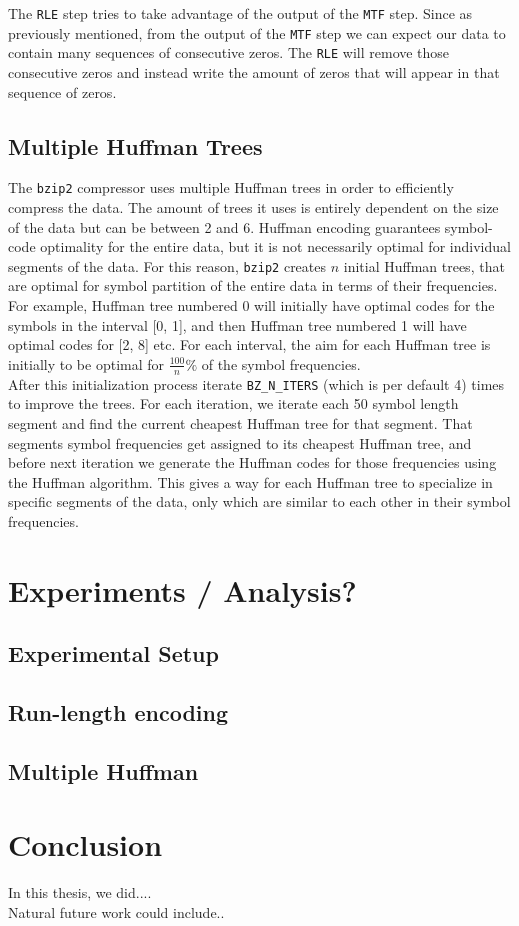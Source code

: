 \documentclass{article}
\begin{document}
The \texttt{RLE} step tries to take advantage of the output of the \texttt{MTF} step. Since as previously mentioned, from the output of the \texttt{MTF} step we can expect our data to contain many sequences of consecutive zeros. The \texttt{RLE} will remove those consecutive zeros and instead write the amount of zeros that will appear in that sequence of zeros.


\subsection{Multiple Huffman Trees}
The \texttt{bzip2} compressor uses multiple Huffman trees in order to efficiently compress the data. The amount of trees it uses is entirely dependent on the size of the data but can be between 2 and 6.
Huffman encoding guarantees symbol-code optimality for the entire data, but it is not necessarily optimal for individual segments of the data. For this reason, \texttt{bzip2} creates \(n\) initial Huffman trees, that are optimal for symbol partition of the entire data in terms of their frequencies. For example, Huffman tree numbered 0 will initially have optimal codes for the symbols in the interval [0, 1], and then Huffman tree numbered 1 will have optimal codes for [2, 8] etc.
For each interval, the aim for each Huffman tree is initially to be optimal for \(\frac{100}{n}\%\) of the symbol frequencies. \\
After this initialization process iterate \texttt{BZ\_N\_ITERS} (which is per default 4) times to improve the trees. For each iteration, we iterate each 50 symbol length segment and find the current cheapest Huffman tree for that segment. That segments symbol frequencies get assigned to its cheapest Huffman tree, and before next iteration we generate the Huffman codes for those frequencies using the Huffman algorithm.
This gives a way for each Huffman tree to specialize in specific segments of the data, only which are similar to each other in their symbol frequencies.

\section{Experiments / Analysis?}
\subsection{Experimental Setup}
\subsection{Run-length encoding}

\subsection{Multiple Huffman}

\section{Conclusion}
In this thesis, we did.... \\
Natural future work could include..


\printbibliography %
\end{document}
